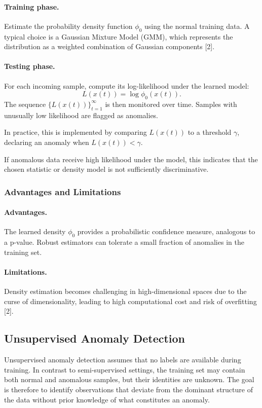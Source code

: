 \documentclass{article}
\renewcommand{\cite}[1]{[#1]}
\begin{document}
\paragraph{Training phase.}  
Estimate the probability density function $\phi_0$ using the normal training
data. A typical choice is a Gaussian Mixture Model (GMM), which represents the
distribution as a weighted combination of Gaussian components \cite{2}.

\paragraph{Testing phase.}  
For each incoming sample, compute its log-likelihood under the learned model:
\[
L(x(t))=\log \phi_0(x(t)).
\]
The sequence $\{L(x(t))\}_{t=1}^{\infty}$ is then monitored over time. Samples
with unusually low likelihood are flagged as anomalies.

In practice, this is implemented by comparing $L(x(t))$ to a threshold
$\gamma$, declaring an anomaly when $L(x(t)) < \gamma$.

If anomalous data receive high likelihood under the model, this indicates that
the chosen statistic or density model is not sufficiently discriminative.

\subsubsection{Advantages and Limitations}

\paragraph{Advantages.}  
The learned density $\phi_0$ provides a probabilistic confidence measure,
analogous to a p-value. Robust estimators can tolerate a small fraction of
anomalies in the training set.

\paragraph{Limitations.}  
Density estimation becomes challenging in high-dimensional spaces due to the
curse of dimensionality, leading to high computational cost and risk of
overfitting \cite{2}.

\subsection{Unsupervised Anomaly Detection}

Unsupervised anomaly detection assumes that no labels are available during
training. In contrast to semi-supervised settings, the training set may contain
both normal and anomalous samples, but their identities are unknown. The goal
is therefore to identify observations that deviate from the dominant structure
of the data without prior knowledge of what constitutes an anomaly.
\end{document}
